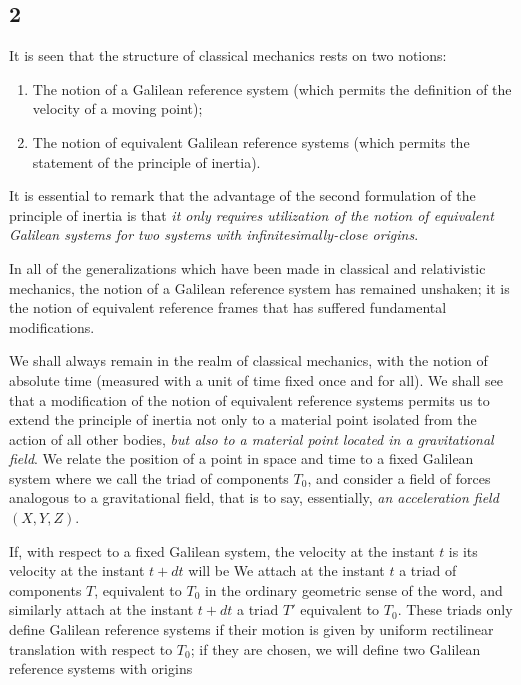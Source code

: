 \subsection*{2}
It is seen that the structure of classical mechanics rests on two notions:
\begin{enumerate}
    \item The notion of a Galilean reference system (which permits the definition of the velocity of a moving point);
    \item The notion of equivalent Galilean reference systems (which permits the statement of the principle of inertia).
\end{enumerate}

It is essential to remark that the advantage of the second formulation of the principle of inertia is that \textit{it only requires utilization of the notion of equivalent Galilean systems for two systems with infinitesimally-close origins}.

In all of the generalizations which have been made in classical and relativistic mechanics, the notion of a Galilean reference system has remained unshaken; it is the notion of equivalent reference frames that has suffered fundamental modifications.

We shall always remain in the realm of classical mechanics, with the notion of absolute time (measured with a unit of time fixed once and for all). We shall see that a modification of the notion of equivalent reference systems permits us to extend the principle of inertia not only to a material point isolated from the action of all other bodies, \textit{but also to a material point located in a gravitational field}. We relate the position of a point in space and time to a fixed Galilean system where we call the triad of components $T_0$, and consider a field of forces analogous to a gravitational field, that is to say, essentially, \textit{an acceleration field} $(X, Y, Z)$.

If, with respect to a fixed Galilean system, the velocity at the instant $t$ is
its velocity at the instant $t+dt$ will be
We attach  at the instant $t$ a triad of components $T$, equivalent to $T_0$
in the ordinary geometric sense of the word, and similarly attach at the instant $t+dt$ a triad $T'$ equivalent to $T_0$. These triads only define Galilean reference systems if their motion is given by uniform rectilinear translation with respect to $T_0$; if they are  chosen, we will define two Galilean reference systems with origins


